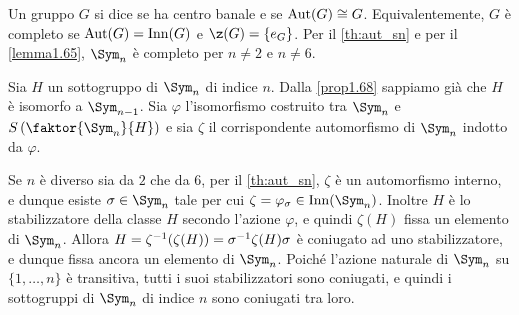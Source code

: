 \documentclass[11pt]{scrartcl}
\begin{document}
	\begin{remark}
		Un gruppo $G$ si dice  se ha centro banale e se
		$\operatorname{Aut}(G) \cong G$. Equivalentemente, $G$ è completo se $\operatorname{Aut}(G) = \operatorname{Inn}(G)$
		e $\z(G) = \{e_G\}$. Per il \autoref{th:aut_sn} e per il \autoref{lemma1.65}, $\Sym_n$ è completo per $n \neq 2$ e $n \neq 6$. \medskip
	\end{remark}
	
	\begin{remark}
		Sia $H$ un sottogruppo di $\Sym_n$ di indice $n$. Dalla \autoref{prop1.68}
		sappiamo già che $H$ è isomorfo a $\Sym_{n-1}$.
		Sia $\varphi$ l'isomorfismo costruito tra $\Sym_n$ e $S\left( \faktor{\Sym_n}{H} \right)$ e sia $\zeta$ il corrispondente automorfismo di $\Sym_n$ indotto da $\varphi$. \medskip
		
		Se $n$ è diverso sia da $2$ che da $6$, per il \autoref{th:aut_sn},
		$\zeta$ è un automorfismo interno, e dunque esiste $\sigma \in \Sym_n$ tale
		per cui $\zeta = \varphi_\sigma \in \Inn(\Sym_n)$. Inoltre $H$ è lo stabilizzatore
		della classe $H$ secondo l'azione $\varphi$, e quindi $\zeta(H)$ fissa un elemento
		di $\Sym_n$. Allora $H = \zeta^{-1}(\zeta(H)) = \sigma^{-1} \zeta(H) \sigma$
		è coniugato ad uno stabilizzatore, e dunque fissa ancora un elemento di
		$\Sym_n$. Poiché l'azione naturale di $\Sym_n$ su $\{1, \ldots, n\}$ è transitiva, tutti i suoi
		stabilizzatori sono coniugati, e quindi i sottogruppi di $\Sym_n$ di indice
		$n$ sono coniugati tra loro.
	\end{remark}
	
\end{document}
